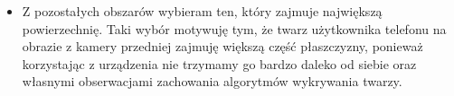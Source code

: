 \documentclass[10pt, a4paper]{article}
\begin{document}
\begin{itemize}
    \item Z pozostałych obszarów wybieram ten, który zajmuje największą powierzechnię. Taki wybór motywuję tym, że twarz użytkownika telefonu na obrazie z kamery przedniej zajmuję większą część płaszczyzny, ponieważ korzystając z urządzenia nie trzymamy go bardzo daleko od siebie oraz własnymi obserwacjami zachowania algorytmów wykrywania twarzy.
    
    \begin{figure}[H]
        \begin{center}
            \hspace{8mm}

\end{center}
\end{figure}
\end{itemize}
\end{document}
